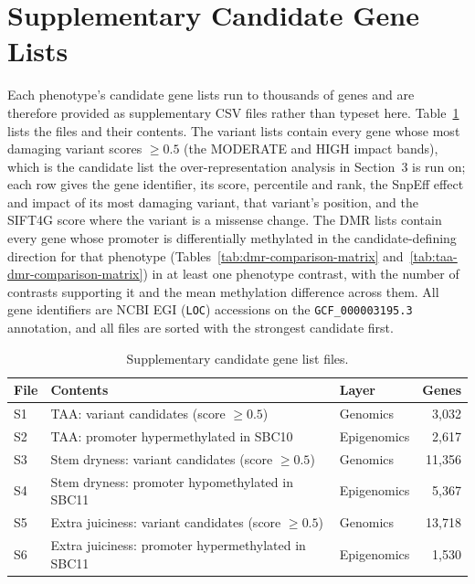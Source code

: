 \clearpage
\section{Supplementary Candidate Gene Lists}
\hspace{1em}Each phenotype's candidate gene lists run to thousands of genes and are therefore provided as supplementary CSV files rather than typeset here. Table~\ref{tab:supp-gene-lists} lists the files and their contents. The variant lists contain every gene whose most damaging variant scores $\geq 0.5$ (the MODERATE and HIGH impact bands), which is the candidate list the over-representation analysis in Section~3 is run on; each row gives the gene identifier, its score, percentile and rank, the SnpEff effect and impact of its most damaging variant, that variant's position, and the SIFT4G score where the variant is a missense change. The DMR lists contain every gene whose promoter is differentially methylated in the candidate-defining direction for that phenotype (Tables~\ref{tab:dmr-comparison-matrix} and~\ref{tab:taa-dmr-comparison-matrix}) in at least one phenotype contrast, with the number of contrasts supporting it and the mean methylation difference across them. All gene identifiers are NCBI EGI (\texttt{LOC}) accessions on the \texttt{GCF\_000003195.3} annotation, and all files are sorted with the strongest candidate first.

\begin{table}[htbp]
    \centering
    \caption{Supplementary candidate gene list files.}
    \label{tab:supp-gene-lists}
    \begin{tabularx}{\textwidth}{l X l r}
        \toprule
        File & Contents & Layer & Genes \\
        \midrule
        S1 & TAA: variant candidates (score $\geq 0.5$) & Genomics & 3,032 \\
        S2 & TAA: promoter hypermethylated in SBC10 & Epigenomics & 2,617 \\
        S3 & Stem dryness: variant candidates (score $\geq 0.5$) & Genomics & 11,356 \\
        S4 & Stem dryness: promoter hypomethylated in SBC11 & Epigenomics & 5,367 \\
        S5 & Extra juiciness: variant candidates (score $\geq 0.5$) & Genomics & 13,718 \\
        S6 & Extra juiciness: promoter hypermethylated in SBC11 & Epigenomics & 1,530 \\
        \bottomrule
    \end{tabularx}
\end{table}

